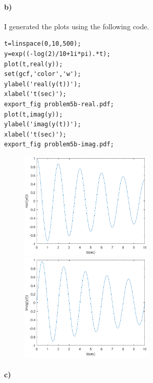 \documentclass[12pt]{article}
\begin{document}
\paragraph{b)}

I generated the plots using the following code.
\begin{verbatim}
t=linspace(0,10,500);
y=exp((-log(2)/10+1i*pi).*t);
plot(t,real(y));
set(gcf,'color','w');
ylabel('real(y(t))');
xlabel('t(sec)');
export_fig problem5b-real.pdf;
plot(t,imag(y));
ylabel('imag(y(t))');
xlabel('t(sec)');
export_fig problem5b-imag.pdf;
\end{verbatim}
\begin{figure}[H]
    \begin{center}
        \includegraphics[width=2.5in]{problem5b-real.pdf}
		\includegraphics[width=2.5in]{problem5b-imag.pdf}
    \end{center}
\end{figure}

\paragraph{c)}
\end{document}
